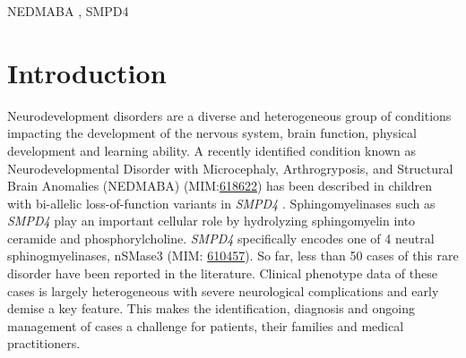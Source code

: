 \documentclass[
  authoryear,
  preprint,
  3p]{elsarticle}
\begin{document}
\begin{frontmatter}
\begin{keyword}
    NEDMABA \sep 
    SMPD4
\end{keyword}
\end{frontmatter}\ifdefined\Shaded\renewenvironment{Shaded}{\begin{tcolorbox}[borderline west={3pt}{0pt}{shadecolor}, frame hidden, boxrule=0pt, enhanced, interior hidden, breakable, sharp corners]}{\end{tcolorbox}}\fi

\hypertarget{introduction}{%
\section{Introduction}\label{introduction}}

Neurodevelopment disorders are a diverse and heterogeneous group of
conditions impacting the development of the nervous system, brain
function, physical development and learning ability. A recently
identified condition known as Neurodevelopmental Disorder with
Microcephaly, Arthrogryposis, and Structural Brain Anomalies (NEDMABA)
(MIM:\href{https://omim.org/entry/618622}{618622}) has been described in
children with bi-allelic loss-of-function variants in \emph{SMPD4}
\citep{magini2019loss}. Sphingomyelinases such as \emph{SMPD4} play an
important cellular role by hydrolyzing sphingomyelin into ceramide and
phosphorylcholine. \emph{SMPD4} specifically encodes one of 4 neutral
sphinogmyelinases, nSMase3 (MIM:
\href{http://omim.org/entry/610457}{610457}). So far, less than 50 cases
of this rare disorder have been reported in the literature. Clinical
phenotype data of these cases is largely heterogeneous with severe
neurological complications and early demise a key feature. This makes
the identification, diagnosis and ongoing management of cases a
challenge for patients, their families and medical practitioners.
\end{document}
